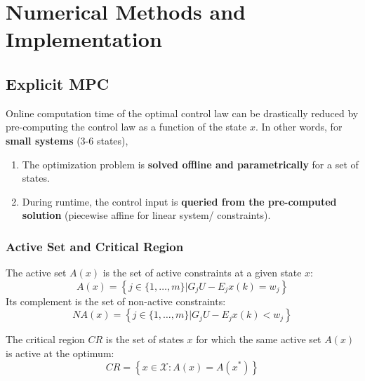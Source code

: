 \section{Numerical Methods and Implementation}

\subsection{Explicit MPC}
Online computation time of the optimal control law can be drastically reduced by pre-computing the control law as a function of the state $x$.
In other words, for \textbf{small systems} (3-6 states),
\begin{enumerate}
    \item The optimization problem is \textbf{solved offline and parametrically} for a set of states.
    \item During runtime, the control input is \textbf{queried from the pre-computed solution} (piecewise affine for linear system/ constraints).
\end{enumerate}

\subsubsection{Active Set and Critical Region}

The active set $A(x)$ is the set of active constraints at a given state $x$:
\begin{equation*}
    A(x) = \left\{ j \in \{1,\ldots,m\} \Big| G_j U - E_j x(k) = w_j \right\}
\end{equation*}
Its complement is the set of non-active constraints:
\begin{equation*}
    NA(x) = \left\{ j \in \{1,\ldots,m\} \Big| G_j U - E_j x(k) < w_j \right\}
\end{equation*}

\newpar{}

The critical region $CR$ is the set of states $x$ for which the same active set $A(x)$ is active at the optimum:
\begin{equation*}
    CR = \left\{x\in \mathcal{X} : A(x)=A(x^*)\right\}
\end{equation*}

